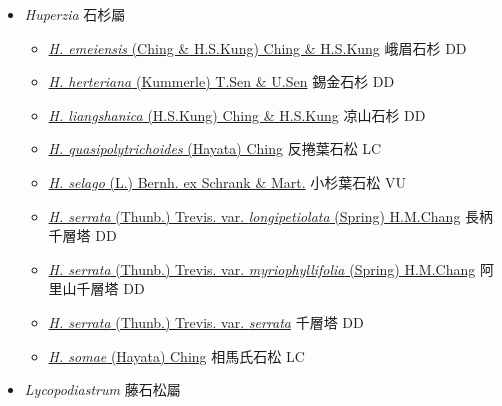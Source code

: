 
  \begin{itemize}
 \item[    ] \textit{Huperzia} 石杉屬
                                
  \begin{itemize}
        \item[] \href{http://www.theplantlist.org/tpl1.1/search?q=Huperzia+emeiensis}{\textit{H. emeiensis} (Ching \& H.S.Kung) Ching \& H.S.Kung}   峨眉石杉   DD
        \item[] \href{http://www.theplantlist.org/tpl1.1/search?q=Huperzia+herteriana}{\textit{H. herteriana} (Kummerle) T.Sen \& U.Sen}   錫金石杉   DD
        \item[] \href{http://www.theplantlist.org/tpl1.1/search?q=Huperzia+liangshanica}{\textit{H. liangshanica} (H.S.Kung) Ching \& H.S.Kung}   凉山石杉   DD
        \item[] \href{http://www.theplantlist.org/tpl1.1/search?q=Huperzia+quasipolytrichoides}{\textit{H. quasipolytrichoides} (Hayata) Ching}   反捲葉石松   LC
        \item[] \href{http://www.theplantlist.org/tpl1.1/search?q=Huperzia+selago}{\textit{H. selago} (L.) Bernh. ex Schrank \& Mart.}   小杉葉石松   VU
        \item[] \href{http://www.theplantlist.org/tpl1.1/search?q=Huperzia+serrata+var.+longipetiolata}{\textit{H. serrata} (Thunb.) Trevis. var. \textit{longipetiolata} (Spring) H.M.Chang}  
                                        長柄千層塔   DD
        \item[] \href{http://www.theplantlist.org/tpl1.1/search?q=Huperzia+serrata+var.+myriophyllifolia}{\textit{H. serrata} (Thunb.) Trevis. var. \textit{myriophyllifolia} (Spring) H.M.Chang}  
                                        阿里山千層塔   DD
        \item[] \href{http://www.theplantlist.org/tpl1.1/search?q=Huperzia+serrata+var.+serrata}{\textit{H. serrata} (Thunb.) Trevis. var. \textit{serrata}}  
                                        千層塔   DD
        \item[] \href{http://www.theplantlist.org/tpl1.1/search?q=Huperzia+somae}{\textit{H. somae} (Hayata) Ching}   相馬氏石松   LC
  \end{itemize}
 \item[    ] \textit{Lycopodiastrum} 藤石松屬
                                

\end{itemize}
